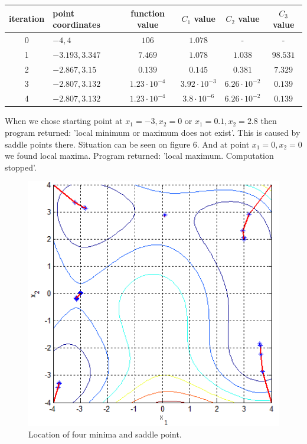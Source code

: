 \documentclass[12pt]{article}
\begin{document}
\begin{table}[H]
	\begin{tabularx}{\textwidth}{c|X|c|c|c|c|}
		iteration & point coordinates & function value & $C_1$ value & $C_2$ value & $C_3$ value\\
		\hline
		0 & $-4, 4$ & $106$ & $1.078$ & - & - \\
		\hline
		1 & $-3.193, 3.347$ & $7.469$ & $1.078$ & $1.038$ & $98.531$ \\
		\hline
		2 & $-2.867, 3.15$ & $0.139$ & $0.145$ & $0.381$ & $7.329$ \\
		\hline
		3 & $-2.807, 3.132$ & $1.23\cdot10^{-4}$ & $3.92\cdot10^{-3}$ & $6.26\cdot10^{-2}$ & $0.139$ \\
		\hline
		4 & $-2.807, 3.132$ & $1.23\cdot10^{-4}$ & $3.8\cdot10^{-6}$ & $6.26\cdot10^{-2}$ & $0.139$ \\ 
		\hline
	\end{tabularx}	
\end{table}	
When we chose starting point at $x_1=-3, x_2=0$ or $x_1=0.1, x_2=2.8$ then program returned: 'local minimum or maximum does not exist'. This is caused by saddle points there. Situation can be seen on figure 6. And at point $x_1=0, x_2=0$ we found local maxima. Program returned: 'local maximum. Computation stopped'. 
\begin{figure}[H]
	\includegraphics[width=16cm]{himm_results.png}
		\caption{Location of four minima and saddle point.}
\end{figure} 
\end{document}
